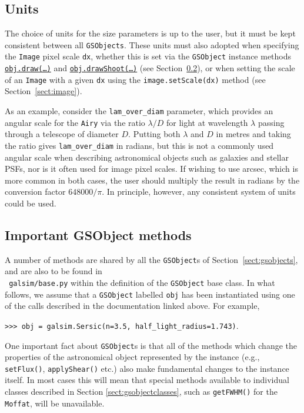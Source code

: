 \documentclass[preprint,11pt]{../../devel/modules/aastex}
\begin{document}
\subsection{Units}
The choice of units for the size parameters is up to the user,
but it must be kept consistent between all \texttt{GSObjects}.  These
units must also adopted when specifying the \texttt{Image} pixel
scale \texttt{dx}, whether this is set via the \texttt{GSObject}
instance methods \href{http://galsim-developers.github.com/GalSim/classgalsim_1_1base_1_1_g_s_object.html#ae0b346a8b438dedbc7f60a52220869d8}{\texttt{obj.draw(\dots)}}
and
\href{http://galsim-developers.github.com/GalSim/classgalsim_1_1base_1_1_g_s_object.html#a42ac334d2840ba3fa832988e998beca0}{\texttt{obj.drawShoot(\dots)}}
(see Section~\ref{sect:gsobjectmethods}),
or when setting the scale of an \texttt{Image} with a given
\texttt{dx} using the \texttt{image.setScale(dx)} method (see Section~\ref{sect:image}).

As an example, consider the
\texttt{lam\_over\_diam} parameter, which provides an angular scale for
the \texttt{Airy} via
the ratio $\lambda / D$ for light at wavelength $\lambda$ passing
through a telescope of diameter $D$. Putting both $\lambda$ and
$D$ in metres and taking the ratio gives \texttt{lam\_over\_diam} in
radians, but this is not a commonly used angular scale when describing
astronomical objects such as galaxies and stellar PSFs, nor is
it often used for image pixel scales.  If wishing to use arcsec, which
is more common in both cases, the user should multiply the result in
radians by the conversion factor
$648000 / \pi$.  In principle, however, any consistent
system of units could be used.


\subsection{Important GSObject methods}\label{sect:gsobjectmethods}
A number of methods are shared by all the \texttt{GSObject}s of
Section~\ref{sect:gsobjects}, and are also to be found in \\ {\tt
 galsim/base.py} within the definition of the
\texttt{GSObject} base class.  In what follows, we assume that a
\texttt{GSObject} labelled \texttt{obj} has been instantiated using
one of the calls described in the documentation linked above.  For
example,

{\tt >>> obj = galsim.Sersic(n=3.5, half\_light\_radius=1.743)}.

One important fact about \texttt{GSObject}s is that all of the
methods which change the properties of the astronomical object
represented by the instance (e.g., \texttt{setFlux()},
  \texttt{applyShear()} etc.) also make fundamental changes to the
  instance itself.  In most cases this will mean that special methods
  available to individual classes described in Section
  \ref{sect:gsobjectclasses}, such as \texttt{getFWHM()} for the
  \texttt{Moffat}, will be unavailable.
\end{document}

